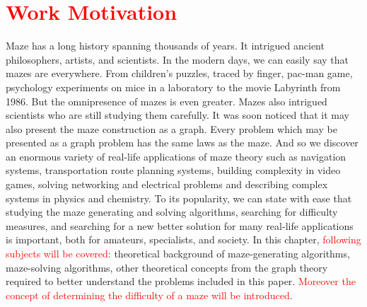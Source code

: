 \chapter{\textcolor{red}{Work Motivation}}\label{cha:background}
Maze has a long history spanning thousands of years. It intrigued ancient philosophers, artists, and scientists. In the modern days, we can easily say that mazes are everywhere.
From children's puzzles, traced by finger, pac-man game, psychology experiments on mice in a laboratory to the movie Labyrinth from 1986. But the omnipresence of mazes is even greater. 
Mazes also intrigued scientists who are still studying them carefully. It was soon noticed that it may also present the maze construction as a graph. Every problem which may be presented as a graph problem has the same laws as the maze. And so we discover an enormous variety of real-life applications of maze theory such as navigation systems, transportation route planning systems, building complexity in video games, solving networking and electrical problems and describing complex systems in physics and chemistry.
To its popularity, we can state with ease that studying the maze generating and solving algorithms, searching for difficulty measures, and searching for a new better solution for many real-life applications is important, both for amateurs, specialists, and society. In this chapter, \textcolor{red}{following subjects will be covered:} theoretical background of maze-generating algorithms, maze-solving algorithms, other theoretical concepts from the graph theory required to better understand the problems included in this paper. \textcolor{red}{Moreover the concept of determining the difficulty of a maze will be introduced}. 
